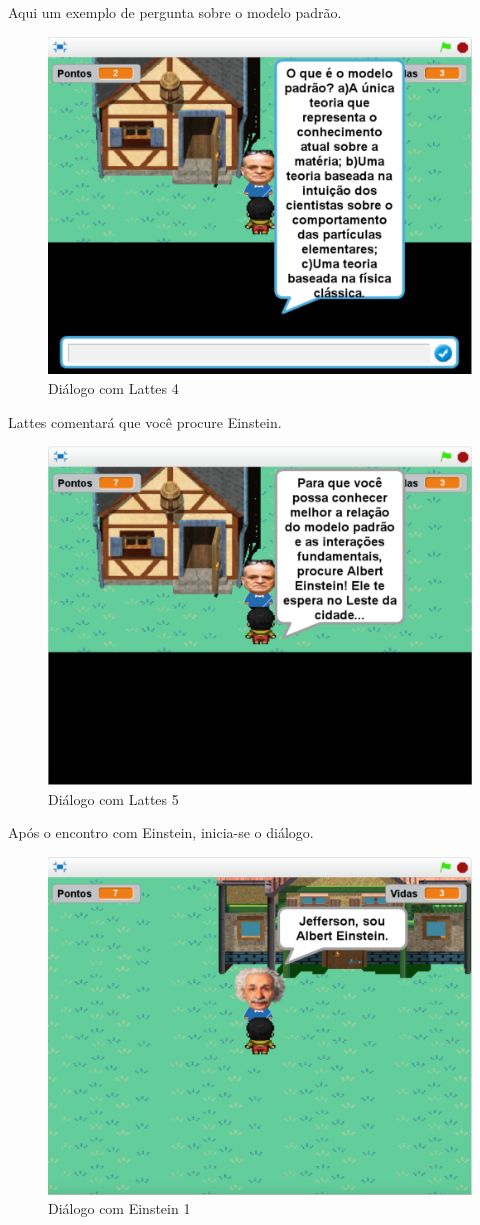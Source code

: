 \documentclass[12pt,fleqn]{book} %
\begin{document}
Aqui um exemplo de pergunta sobre o modelo padrão.

\begin{figure}[h]
	\centering
	\includegraphics[width=0.65 \textwidth]{Produto/jogo_13}
	\caption{Diálogo com Lattes 4}
	\label{fig:app_a:jogo13}
\end{figure}

\newpage

Lattes comentará que você procure Einstein.

\begin{figure}[h]
	\centering
	\includegraphics[width=0.65 \textwidth]{Produto/jogo_14}
	\caption{Diálogo com Lattes 5}
	\label{fig:app_a:jogo14}
\end{figure}

Após o encontro com Einstein, inicia-se o diálogo.

\begin{figure}[h]
	\centering
	\includegraphics[width=0.65 \textwidth]{Produto/jogo_15}
	\caption{Diálogo com Einstein 1}
	\label{fig:app_a:jogo15}
\end{figure}
\end{document}
